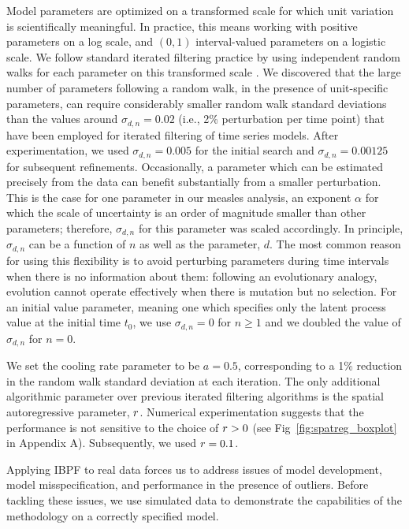 \documentclass[12pt]{article}\usepackage[]{graphicx}\usepackage[]{xcolor}
\begin{document}
Model parameters are optimized on a transformed scale for which unit variation is scientifically meaningful.
In practice, this means working with positive parameters on a log scale, and $(0,1)$ interval-valued parameters on a logistic scale.
We follow standard iterated filtering practice by using independent random walks for each parameter on this transformed scale \citep{king16}.
We discovered that the large number of parameters following a random walk, in the presence of unit-specific parameters, can require considerably smaller random walk standard deviations than the values around $\sigma_{d,n}=0.02$ (i.e., 2\% perturbation per time point) that have been employed for iterated filtering of time series models.
After experimentation, we used $\sigma_{d,n}=0.005$ for the initial search and $\sigma_{d,n}=0.00125$ for subsequent refinements.
Occasionally, a parameter which can be estimated precisely from the data can benefit substantially from a smaller perturbation.
This is the case for one parameter in our measles analysis, an exponent $\alpha$ for which the scale of uncertainty is an order of magnitude smaller than other parameters; therefore, $\sigma_{d,n}$ for this parameter was scaled accordingly.
In principle, $\sigma_{d,n}$ can be a function of $n$ as well as the parameter, $d$.
The most common reason for using this flexibility is to avoid perturbing parameters during time intervals when there is no information about them: following an evolutionary analogy, evolution cannot operate effectively when there is mutation but no selection.
For an initial value parameter, meaning one which specifies only the latent process value at the initial time $t_0$, we use $\sigma_{d,n}=0$ for $n\ge 1$ and we doubled the value of $\sigma_{d,n}$ for $n=0$.

We set the cooling rate parameter to be $a=0.5$, corresponding to a 1\% reduction in the random walk standard deviation at each iteration.
The only additional algorithmic parameter over previous iterated filtering algorithms is the spatial autoregressive parameter, $r$.
Numerical experimentation suggests that the performance is not sensitive to the choice of $r>0$ (see Fig~\ref{fig:spatreg_boxplot} in Appendix A).
Subsequently, we used $r=0.1$.

Applying IBPF to real data forces us to address issues of model development, model misspecification, and performance in the presence of outliers.
Before tackling these issues, we use simulated data to demonstrate the capabilities of the methodology on a correctly specified model.
\end{document}
